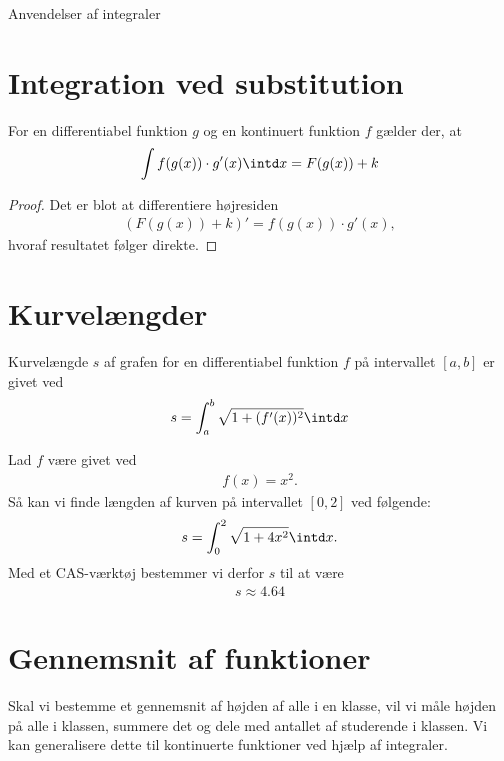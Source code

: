 \begin{center}
\Huge
Anvendelser af integraler
\end{center}

\section*{Integration ved substitution}

\begin{setn}
For en differentiabel funktion $g$ og en kontinuert funktion $f$ gælder der, at 
\begin{align*}
\int f(g(x))\cdot g'(x) \intd x = F(g(x)) + k
\end{align*}
\end{setn}
\begin{proof}
Det er blot at differentiere højresiden
\begin{align*}
\left(F(g(x)) + k \right)' = f(g(x))\cdot g'(x),
\end{align*}
hvoraf resultatet følger direkte.
\end{proof}

\section*{Kurvelængder}
\begin{setn}
Kurvelængde $s$ af grafen for en differentiabel funktion $f$ på intervallet $[a,b]$ er givet ved
\begin{align*}
s = \int_a^b\sqrt{1+(f'(x))^2} \intd x
\end{align*}
\end{setn}

\begin{exa}
Lad $f$ være givet ved
\begin{align*}
f(x) = x^2.
\end{align*}
Så kan vi finde længden af kurven på intervallet $[0,2]$ ved følgende:
\begin{align*}
s = \int_0^2\sqrt{1+4x^2}\intd x.
\end{align*}
Med et CAS-værktøj bestemmer vi derfor $s$ til at være
\begin{align*}
s \approx 4.64
\end{align*}
\end{exa}

\section*{Gennemsnit af funktioner}
Skal vi bestemme et gennemsnit af højden af alle i en klasse, vil vi måle højden på alle i klassen, summere det og dele med antallet af studerende i klassen. Vi kan generalisere dette til kontinuerte funktioner ved hjælp af integraler.

